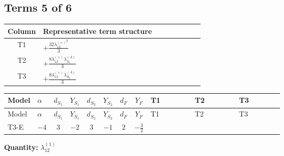 \documentclass[8pt]{article}
\begin{document}
\begin{landscape}
\subsection*{Terms 5 of 6}
\begin{center}
\begin{tabular}{@{}c >{\raggedright\arraybackslash}p{0.82\linewidth}@{}}
\toprule
Column & Representative term structure \\
\midrule
T1 & \(\displaystyle +\frac{32 {\lambda_{12}^{(\times)}}^2}{3}\) \\
\midrule
T2 & \(\displaystyle +\frac{8 {\lambda_{12}^{(\times)}} {\lambda_{S_1}^{(A)}}}{3}\) \\
\midrule
T3 & \(\displaystyle +\frac{8 {\lambda_{12}^{(\times)}} {\lambda_{S_2}^{(A)}}}{3}\) \\
\midrule
\bottomrule
\end{tabular}
\end{center}
\smallskip
\tiny
\begin{longtable}{@{}llcccccc >{\raggedright\arraybackslash}p{0.21\linewidth} >{\raggedright\arraybackslash}p{0.21\linewidth} >{\raggedright\arraybackslash}p{0.21\linewidth}@{}}
\toprule
Model & $\alpha$ & $d_{S_1}$ & $Y_{S_1}$ & $d_{S_2}$ & $Y_{S_2}$ & $d_F$ & $Y_F$ & T1 & T2 & T3 \\
\midrule
\endfirsthead
\toprule
Model & $\alpha$ & $d_{S_1}$ & $Y_{S_1}$ & $d_{S_2}$ & $Y_{S_2}$ & $d_F$ & $Y_F$ & T1 & T2 & T3 \\
\midrule
\endhead
T3-E & $-4$ & $3$ & $-2$ & $3$ & $-1$ & $2$ & $-\frac{3}{2}$ & \scriptsize\adjustbox{max width=\linewidth}{$\begin{gathered} +\frac{32 {\lambda_{12}^{(\times)}}^2}{3}\end{gathered}$} & \scriptsize\adjustbox{max width=\linewidth}{$\begin{gathered} +\frac{8 {\lambda_{12}^{(\times)}} {\lambda_{S_1}^{(A)}}}{3}\end{gathered}$} & \scriptsize\adjustbox{max width=\linewidth}{$\begin{gathered} +\frac{8 {\lambda_{12}^{(\times)}} {\lambda_{S_2}^{(A)}}}{3}\end{gathered}$} \\
\midrule
\bottomrule
\end{longtable}
\clearpage
\noindent\textbf{Quantity: }$\lambda_{12}^{(1)}$\par\smallskip

\end{landscape}
\end{document}

